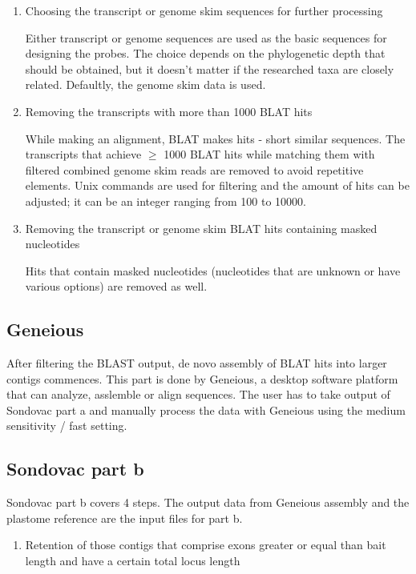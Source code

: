 \begin{enumerate}
\begin{enumerate}
\begin{enumerate}
\item Choosing the transcript or genome skim sequences for further processing

Either transcript or genome sequences are used as the basic sequences for designing the probes. The choice depends on the phylogenetic depth that should be obtained, but it doesn't 
matter if the researched taxa are closely related. Defaultly, the genome skim data is used. 

\item Removing the transcripts with more than 1000 BLAT hits

While making an alignment, BLAT makes hits - short similar sequences. The transcripts that achieve $\geq$ 1000 BLAT hits while matching them with filtered 
combined genome skim reads are removed to avoid repetitive elements. Unix commands are used for filtering and the amount of hits can be adjusted; it can be an 
integer ranging from 100 to 10000. 

\item Removing the transcript or genome skim BLAT hits containing masked nucleotides

Hits that contain masked nucleotides (nucleotides that are unknown or have various options) are removed as well. 

\end{enumerate}
\end{enumerate}


\subsection{Geneious}

After filtering the BLAST output, de novo assembly of BLAT hits into larger contigs commences. This part is done by Geneious, a desktop software platform 
that can analyze, asslemble or align sequences. The user has to take output of Sondovac part a and manually process the data with Geneious using the medium 
sensitivity / fast setting. 

\subsection{Sondovac part b}
Sondovac part b covers 4 steps. The output data from Geneious assembly and the plastome reference are the input files for part b. 
  
\begin{enumerate}
\item Retention of those contigs that comprise exons greater or equal than bait length and have a certain total locus length


\end{enumerate}
\end{enumerate}

